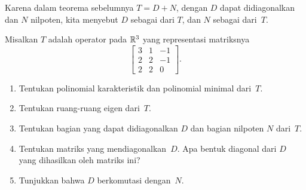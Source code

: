 \begin{defn} Karena dalam teorema sebelumnya $T = D + N$, dengan $D$ dapat didiagonalkan dan $N$ nilpoten,
kita menyebut $D$ sebagai
 dari $T$, dan $N$ sebagai
 dari~$T$.
\end{defn}

\begin{exer} Misalkan $T$ adalah operator pada $\mathbb{R}^3$ yang representasi matriksnya
 \[ \begin{bmatrix}
        3  &  1  & -1 \\
        2  &  2  & -1 \\
        2  &  2  &  0
  \end{bmatrix}. \]

 \begin{enumerate}
  \item Tentukan polinomial karakteristik dan polinomial minimal dari~$T$.
  \item Tentukan ruang-ruang eigen dari~$T$.
  \item Tentukan bagian yang dapat didiagonalkan $D$ dan bagian nilpoten $N$ dari~$T$.
  \item Tentukan matriks yang mendiagonalkan~$D$. Apa bentuk diagonal
dari $D$ yang dihasilkan oleh matriks ini?
  \item Tunjukkan bahwa $D$ berkomutasi dengan~$N$.
 \end{enumerate}
\end{exer}
